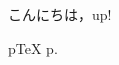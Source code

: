 \documentclass[dvipdfmx]{ujarticle}
\begin{document}
こんにちは，up\LaTeXe!

pTeX p\number\ptexversion.\number\ptexminorversion\ptexrevision
\end{document}
